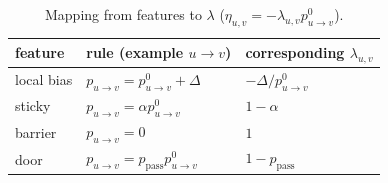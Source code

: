 \documentclass[11pt]{article}
\begin{document}
\begin{table}[!htbp]
  \centering
  \begin{tabular}{lll}
    \toprule
    feature & rule (example $u\to v$) & corresponding $\lambda_{u,v}$\\
    \midrule
    local bias & $p_{u\to v}=p_{u\to v}^0+\Delta$ & $-\Delta/p_{u\to v}^0$\\
    sticky & $p_{u\to v}=\alpha p_{u\to v}^0$ & $1-\alpha$\\
    barrier & $p_{u\to v}=0$ & $1$\\
    door & $p_{u\to v}=p_{\text{pass}}p_{u\to v}^0$ & $1-p_{\text{pass}}$\\
    \bottomrule
  \end{tabular}
  \caption{Mapping from features to $\lambda$ ($\eta_{u,v}=-\lambda_{u,v}p_{u\to v}^0$).}
  \label{tab:lambda-map}
\end{table}
\end{document}

